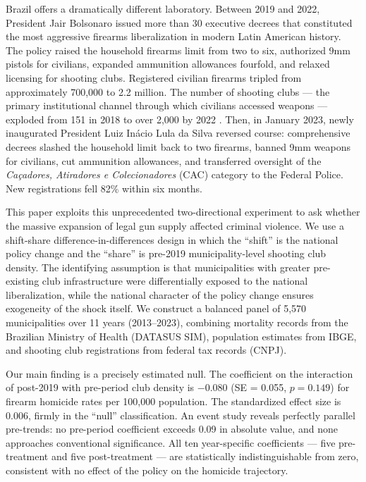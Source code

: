 \documentclass[12pt]{article}
\begin{document}
Brazil offers a dramatically different laboratory. Between 2019 and 2022, President Jair Bolsonaro issued more than 30 executive decrees that constituted the most aggressive firearms liberalization in modern Latin American history. The policy raised the household firearms limit from two to six, authorized 9mm pistols for civilians, expanded ammunition allowances fourfold, and relaxed licensing for shooting clubs. Registered civilian firearms tripled from approximately 700,000 to 2.2 million. The number of shooting clubs --- the primary institutional channel through which civilians accessed weapons --- exploded from 151 in 2018 to over 2,000 by 2022 \citep{fbsp2022armas}. Then, in January 2023, newly inaugurated President Luiz In\'{a}cio Lula da Silva reversed course: comprehensive decrees slashed the household limit back to two firearms, banned 9mm weapons for civilians, cut ammunition allowances, and transferred oversight of the \textit{Ca\c{c}adores, Atiradores e Colecionadores} (CAC) category to the Federal Police. New registrations fell 82\% within six months.

This paper exploits this unprecedented two-directional experiment to ask whether the massive expansion of legal gun supply affected criminal violence. We use a shift-share difference-in-differences design \citep{borusyak2022ssiv, goldsmithpinkham2020, autoretal2013china} in which the ``shift'' is the national policy change and the ``share'' is pre-2019 municipality-level shooting club density. The identifying assumption is that municipalities with greater pre-existing club infrastructure were differentially exposed to the national liberalization, while the national character of the policy change ensures exogeneity of the shock itself. We construct a balanced panel of 5,570 municipalities over 11 years (2013--2023), combining mortality records from the Brazilian Ministry of Health (DATASUS SIM), population estimates from IBGE, and shooting club registrations from federal tax records (CNPJ).

Our main finding is a precisely estimated null. The coefficient on the interaction of post-2019 with pre-period club density is $-0.080$ (SE = 0.055, $p = 0.149$) for firearm homicide rates per 100,000 population. The standardized effect size is 0.006, firmly in the ``null'' classification. An event study reveals perfectly parallel pre-trends: no pre-period coefficient exceeds 0.09 in absolute value, and none approaches conventional significance. All ten year-specific coefficients --- five pre-treatment and five post-treatment --- are statistically indistinguishable from zero, consistent with no effect of the policy on the homicide trajectory.
\end{document}
